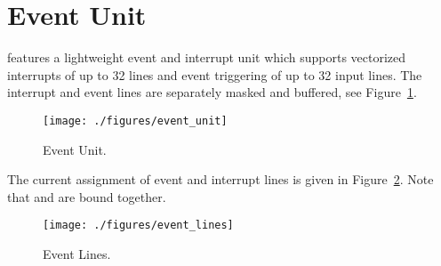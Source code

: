 \section{Event Unit}

\pulpino features a lightweight event and interrupt unit which supports
vectorized interrupts of up to 32 lines and event triggering of up to 32 input
lines. The interrupt and event lines are separately masked and buffered, see
Figure~\ref{fig:event_unit}.


\begin{figure}[H]
  \centering
  \texttt{[image: ./figures/event\_unit]}
  \caption{Event Unit.}
  \label{fig:event_unit}
\end{figure}

The current assignment of event and interrupt lines is given in
Figure~\ref{fig:event_lines}. Note that  and 
are bound together.

\begin{figure}[H]
  \centering
  \texttt{[image: ./figures/event\_lines]}
  \caption{Event Lines.}
  \label{fig:event_lines}
\end{figure}



